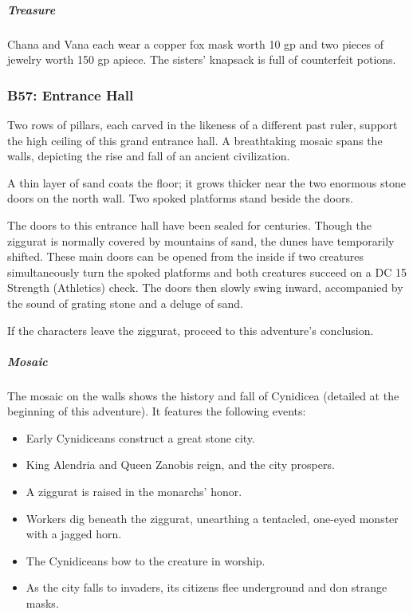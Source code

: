 \documentclass[10pt,a4paper,twoside,bg=print,twocolumn,openany,nodeprecatedcode]{dndbook}
\begin{document}
\subparagraph{Treasure}
Chana and Vana each wear a copper fox mask worth 10 gp and two pieces of jewelry worth 150 gp apiece. The sisters' knapsack is full of counterfeit potions.

\subsubsection{B57: Entrance Hall}
\begin{DndReadAloud}{}
Two rows of pillars, each carved in the likeness of a different past ruler, support the high ceiling of this grand entrance hall. A breathtaking mosaic spans the walls, depicting the rise and fall of an ancient civilization.

A thin layer of sand coats the floor; it grows thicker near the two enormous stone doors on the north wall. Two spoked platforms stand beside the doors.

\end{DndReadAloud}

The doors to this entrance hall have been sealed for centuries. Though the ziggurat is normally covered by mountains of sand, the dunes have temporarily shifted. These main doors can be opened from the inside if two creatures simultaneously turn the spoked platforms and both creatures succeed on a DC 15 Strength (Athletics) check. The doors then slowly swing inward, accompanied by the sound of grating stone and a deluge of sand.

If the characters leave the ziggurat, proceed to this adventure's conclusion.

\subparagraph{Mosaic}
The mosaic on the walls shows the history and fall of Cynidicea (detailed at the beginning of this adventure). It features the following events:


\begin{itemize}
\item Early Cynidiceans construct a great stone city.
\item King Alendria and Queen Zanobis reign, and the city prospers.
\item A ziggurat is raised in the monarchs' honor.
\item Workers dig beneath the ziggurat, unearthing a tentacled, one-eyed monster with a jagged horn.
\item The Cynidiceans bow to the creature in worship.
\item As the city falls to invaders, its citizens flee underground and don strange masks.
\end{itemize}
\end{document}
